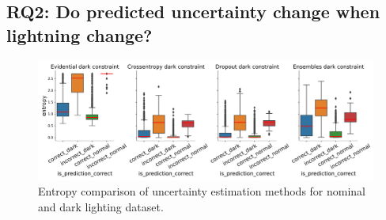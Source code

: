 

\subsection{RQ2: Do predicted uncertainty change when lightning change?}

\begin{figure}[b]
	\centering
	\includegraphics[width=\textwidth]{images/entropy_dark_constraint.png}
	\caption{Entropy comparison of uncertainty estimation methods for nominal and dark lighting dataset.}
	\label{fig:entropy_dark}
\end{figure}


